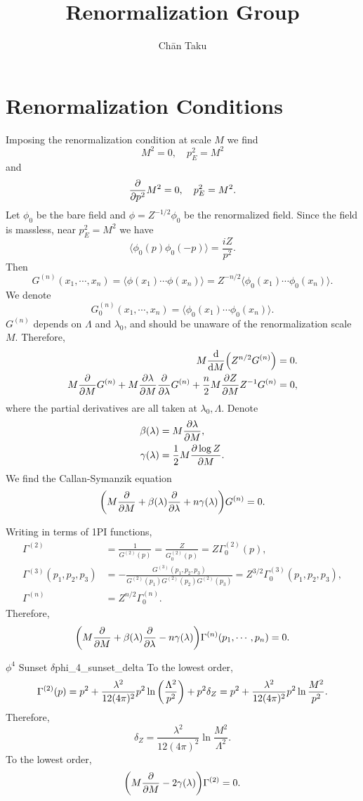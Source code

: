 \documentclass{article}
\title{Renormalization Group}
\author{Ch\=an Taku}
\begin{document}
\maketitle

\section{Renormalization Conditions}

Imposing the renormalization condition at scale $M$ we find
\[ M^2 = 0,\quad p_E^2 = M^2 \]
and
\[ \pdv{p^2}M^2 = 0,\quad p_E^2 = M^2. \]
Let $\phi_0$ be the bare field and $\phi = Z^{-1/2}\phi_0$ be the renormalized field.
Since the field is massless, near $p_E^2 = M^2$ we have
\[ \langle \phi_0(p) \phi_0(-p) \rangle = \frac{iZ}{p^2}. \]
Then
\[ G^{(n)}(x_1,\cdots,x_n) = \langle \phi(x_1) \cdots \phi(x_n) \rangle = Z^{-n/2}\langle \phi_0(x_1) \cdots \phi_0(x_n) \rangle. \]
We denote
\[ G_0^{(n)}(x_1,\cdots,x_n) = \langle \phi_0(x_1) \cdots \phi_0(x_n) \rangle. \]
$G^{(n)}$ depends on $\Lambda$ and $\lambda_0$, and should be unaware of the renormalization scale $M$.
Therefore,
\begin{align*}
    M \dv{M} \qty(Z^{n/2} G^{(n)}) &= 0.\\
    M \pdv{M} G^{(n)} + M \pdv{\lambda}{M} \pdv{\lambda} G^{(n)} + \frac{n}{2} M \pdv{Z}{M} Z^{-1} G^{(n)} &= 0,
\end{align*}
where the partial derivatives are all taken at $\lambda_0,\Lambda$.
Denote
\begin{align*}
    \beta(\lambda) &= M \pdv{\lambda}{M},\\
    \gamma(\lambda) &= \frac{1}{2} M \pdv{\log Z}{M}.
\end{align*}
We find the Callan-Symanzik equation
\[ \qty(M \pdv{M} + \beta(\lambda) \pdv{\lambda} + n\gamma(\lambda)) G^{(n)} = 0. \]

Writing in terms of 1PI functions,
\begin{align*}
    \Gamma^{(2)} &= \frac{1}{G^{(2)}(p)} = \frac{Z}{G^{(2)}_0(p)} = Z \Gamma^{(2)}_0(p), \\
    \Gamma^{(3)}(p_1,p_2,p_3) &= -\frac{G^{(3)}(p_1,p_2,p_3)}{G^{(2)}(p_1)G^{(2)}(p_2)G^{(2)}(p_3)} = Z^{3/2} \Gamma^{(3)}_0(p_1,p_2,p_3), \\
    \Gamma^{(n)} &= Z^{n/2} \Gamma_0^{(n)}.
\end{align*}
Therefore,
\[ \qty(M \pdv{M} + \beta(\lambda)\pdv{\lambda} - n\gamma(\lambda)) \Gamma^{(n)}(p_1,\cdots,p_n) = 0. \]
\begin{example}{$\phi^4$ Sunset $\delta$}{phi_4_sunset_delta}
    To the lowest order,
    \[ \Gamma^{(2)}(p) = p^2 + \frac{\lambda^2}{12(4\pi)^2} p^2 \ln \qty(\frac{\Lambda^2}{p^2}) + p^2 \delta_Z = p^2 + \frac{\lambda^2}{12(4\pi)^2}p^2 \ln \frac{M^2}{p^2}. \]
    Therefore,
    \[ \delta_Z = \frac{\lambda^2}{12(4\pi)^2} \ln \frac{M^2}{\Lambda^2}. \]
    To the lowest order,
    \[ \qty(M\pdv{M} - 2\gamma(\lambda))\Gamma^{(2)} = 0. \]
\end{example}
\end{document}
